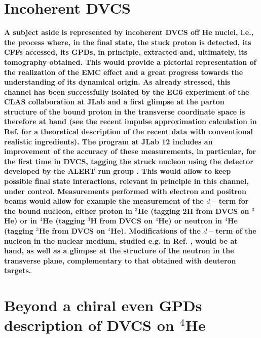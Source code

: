 \documentclass[times, twoside]{PosWhiPap}
\begin{document}
\section*{Incoherent DVCS}
{\bf
A subject aside is represented by incoherent DVCS off He nuclei, i.e.,
the process where, in the final state, the stuck proton is detected, its CFFs accessed, its GPDs, in principle, extracted and, ultimately, its tomography obtained.
This would provide a pictorial representation of the realization of the EMC effect and a great progress towards the understanding of its dynamical origin.
As already stressed, this channel has been successfully isolated by the EG6 experiment of the CLAS collaboration at JLab \cite{Hattawy:2018liu} and a first glimpse at the parton structure of the bound proton in the transverse coordinate space is therefore at hand (see the recent impulse approximation calculation in Ref. \cite{Fucini:2019xlc} for a theoretical description
of the recent data with conventional realistic ingredients).
The program at JLab 12 includes an improvement of the accuracy of these measurements, in particular, for the first time in DVCS, tagging the struck nucleon using the detector
developed by the ALERT run group \cite{Armstrong:2017zcm}.
This would allow to keep possible final state interactions, relevant in principle in this channel, under control.
Measurements performed with 
electron and positron beams  would allow for example the measurement of the $d-$term for the bound nucleon, either proton in $^3$He (tagging 2H from DVCS on $^3$He)  or in $^4$He (tagging $^3$H from 
DVCS on $^4$He) or neutron in $^4$He (tagging $^3$He from DVCS on $^4$He). Modifications 
of the $d-$term of the nucleon in the nuclear medium, studied e.g. in
Ref.
\cite{Jung:2014jja}, would be at hand, as well as a glimpse at the structure of the neutron
in the transverse plane, complementary to that obtained with deuteron targets.}

\section*{Beyond a chiral even GPDs description of DVCS on $^4$He}
\end{document}
